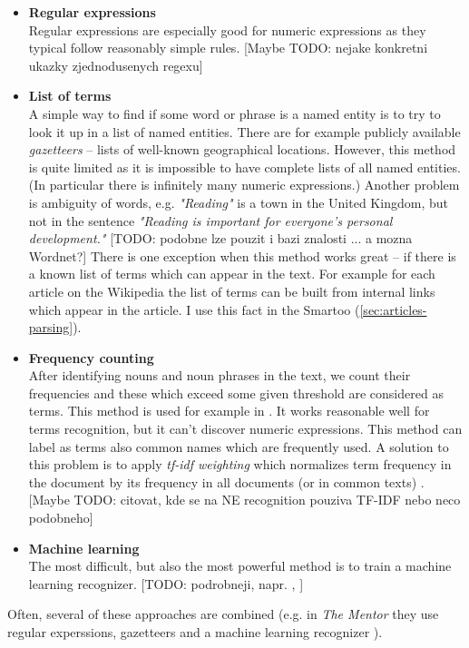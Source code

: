 \documentclass[a4paper, 12pt, twoside]{fithesis2}		%
\renewcommand{\_}{\leavevmode \kern0.07em\vbox{\hrule width0.4em}}
\newcommand{\squarebullet}{\textcolor{black}{\raisebox{0.15em}{\rule{4pt}{4pt}}}}
\newcommand{\emptysquarebullet}{\textcolor{black}{\raisebox{0.10em}{\tiny$\square$}}}
\newenvironment{myItemize}{
  \begin{itemize}[leftmargin=2em,rightmargin=1em,itemsep=\parskip ,parsep=0em,topsep=0em,partopsep=0em]
  \renewcommand{\labelitemi}{\squarebullet}
  \renewcommand{\labelitemii}{\textbullet}
}{
  \end{itemize}
}
\begin{document}
\begin{myItemize}
\item \textbf{Regular expressions}\\
  Regular expressions are especially good for numeric expressions as they typical follow reasonably simple rules.
  [Maybe TODO: nejake konkretni ukazky zjednodusenych regexu]
\item \textbf{List of terms}\\
  A simple way to find if some word or phrase is a named entity is to try to look it up in a list of named entities. There are for example publicly available \textit{gazetteers} -- lists of well-known geographical locations. However, this method is quite limited as it is impossible to have complete lists of all named entities.
(In particular there is infinitely many numeric expressions.)
Another problem is ambiguity of words, e.g. \textit{"Reading"} is a town in the United Kingdom, but not in the sentence \textit{"Reading is important for everyone's personal development."}
  [TODO: podobne lze pouzit i bazi znalosti ... a mozna Wordnet?]
  There is one exception when this method works great -- if there is a known list of terms which can appear in the text. For example for each article on the Wikipedia the list of terms can be built from internal links which appear in the article. I use this fact in the Smartoo (\autoref{sec:articles-parsing}).
\item \textbf{Frequency counting}\\
  After identifying nouns and noun phrases in the text, we count their frequencies and these which exceed some given threshold are considered as terms.
  This method is used for example in \cite{question-gen-mitkov}. It works reasonable well for terms recognition, but it can't discover numeric expressions.
This method can label as terms also common names which are frequently used.
A solution to this problem is to apply \textit{tf-idf weighting} which normalizes term frequency in the document by its frequency in all documents (or in common texts) \cite[][118]{information-retrieval}.
[Maybe TODO: citovat, kde se na NE recognition pouziva TF-IDF nebo neco podobneho]
\item \textbf{Machine learning}\\
  The most difficult, but also the most powerful method is to train a machine learning recognizer.
  [TODO: podrobneji, napr. \cite[][283]{nlp-python}, \autocite{named-entity-recognition}]
\end{myItemize}
Often, several of these approaches are combined (e.g. in \textit{The Mentor} they use regular experssions, gazetteers and a machine learning recognizer \cite{mentor}).
\end{document}
